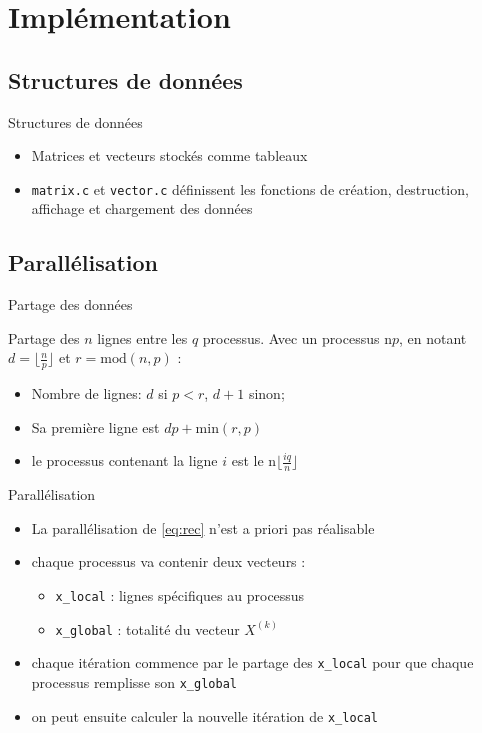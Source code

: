 \documentclass{beamer}
\begin{document}
\section{Implémentation}
\subsection{Structures de données}

\begin{frame}{Structures de données}

\begin{itemize}
    \item Matrices et vecteurs stockés comme tableaux
    \item \texttt{matrix.c} et \texttt{vector.c} définissent les fonctions de création, destruction, affichage et chargement des données
\end{itemize}

\end{frame}

\subsection{Parallélisation}

\begin{frame}{Partage des données}

Partage des \(n\) lignes entre les \(q\) processus.
Avec un processus n\textdegree\(p\), en notant \(d = \lfloor \frac{n}{p} \rfloor\) et \(r = \text{mod}(n,p)\) :
\begin{itemize}
    \item Nombre de lignes:  \(d\) si \(p<r\), \(d+1\) sinon;
    \item Sa première ligne est \(dp+\text{min}(r,p)\)
    \item le processus contenant la ligne \(i\) est le n\textdegree\(\lfloor \frac{iq}{n} \rfloor\)
\end{itemize}

\end{frame}

\begin{frame}{Parallélisation}

\begin{itemize}
    \item La parallélisation de \eqref{eq:rec} n'est a priori pas réalisable
    \item chaque processus va contenir deux vecteurs :
    \begin{itemize}
        \item \lstinline{x_local} : lignes spécifiques au processus
        \item \lstinline{x_global} : totalité du vecteur \(X^{(k)}\)
    \end{itemize}
    \item chaque itération commence par le partage des \lstinline{x_local} pour que chaque processus remplisse son \lstinline{x_global}
    \item on peut ensuite calculer la nouvelle itération de \lstinline{x_local}
\end{itemize}
\end{frame}
\end{document}
